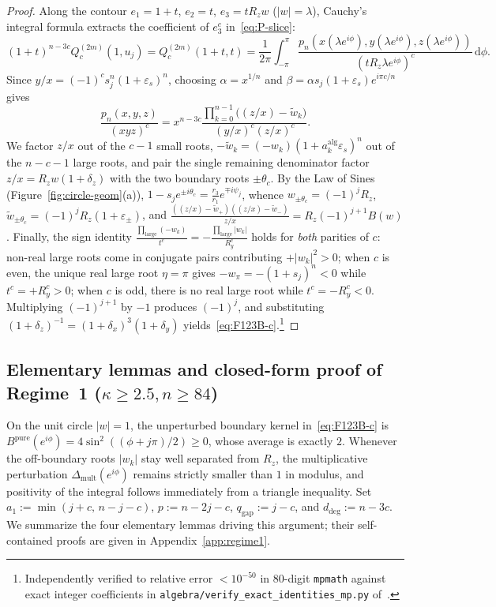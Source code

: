 \documentclass[10pt]{article}
\numberwithin{equation}{section}
\theoremstyle{plain}
\theoremstyle{definition}
\newcommand{\dd}{\mathrm{d}}
\newcommand{\1}{\mathbf{1}}
\newcommand{\code}[1]{\texttt{#1}}
\begin{document}
\begin{proof}
Along the contour $e_1 = 1 + t$, $e_2 = t$, $e_3 = t R_z w$ ($|w| = \lambda$), Cauchy's integral formula extracts the coefficient of $e_3^c$ in~\eqref{eq:P-slice}:
\[
(1 + t)^{n - 3c} Q_c^{(2m)}(1, u_j) = Q_c^{(2m)}(1 + t, t) = \frac{1}{2\pi}\int_{-\pi}^{\pi} \frac{p_n(x(\lambda e^{i\phi}), y(\lambda e^{i\phi}), z(\lambda e^{i\phi}))}{(t R_z \lambda e^{i\phi})^c}\, \dd\phi.
\]
Since $y/x = (-1)^c s_j^n (1 + \varepsilon_s)^n$, choosing $\alpha = x^{1/n}$ and $\beta = \alpha s_j(1 + \varepsilon_s) e^{i\pi c/n}$ gives
\[
\frac{p_n(x, y, z)}{(xyz)^c} = x^{n - 3c}\frac{\prod_{k=0}^{n-1}\bigl((z/x) - \tilde{w}_k\bigr)}{(y/x)^c (z/x)^c}.
\]
We factor $z/x$ out of the $c - 1$ small roots, $-\tilde{w}_k = (-w_k)(1 + a_k^{\mathrm{alg}}\varepsilon_s)^n$ out of the $n - c - 1$ large roots, and pair the single remaining denominator factor $z/x = R_z w(1 + \delta_z)$ with the two boundary roots $\pm\theta_c$. By the Law of Sines (Figure~\ref{fig:circle-geom}(a)), $1 - s_j e^{\pm i\theta_c} = \frac{r_3}{r_1} e^{\mp i\psi_j}$, whence $w_{\pm\theta_c} = (-1)^j R_z$, $\tilde{w}_{\pm\theta_c} = (-1)^j R_z (1 + \varepsilon_\pm)$, and $\frac{((z/x) - \tilde{w}_+)((z/x) - \tilde{w}_-)}{z/x} = R_z (-1)^{j+1} B(w)$. Finally, the sign identity $\frac{\prod_{\mathrm{large}}(-w_k)}{t^c} = -\frac{\prod_{\mathrm{large}}|w_k|}{R_y^c}$ holds for \emph{both} parities of $c$: non-real large roots come in conjugate pairs contributing $+|w_k|^2 > 0$; when $c$ is even, the unique real large root $\eta = \pi$ gives $-w_\pi = -(1+s_j)^n < 0$ while $t^c = +R_y^c > 0$; when $c$ is odd, there is no real large root while $t^c = -R_y^c < 0$. Multiplying $(-1)^{j+1}$ by $-1$ produces $(-1)^j$, and substituting $(1 + \delta_z)^{-1} = (1 + \delta_x)^3 (1 + \delta_y)$ yields~\eqref{eq:F123B-c}.\footnote{Independently verified to relative error $< 10^{-50}$ in $80$-digit \code{mpmath} against exact integer coefficients in \code{algebra/verify\_exact\_identities\_mp.py} of~\cite{JadavRepo2026}.}
\end{proof}

\subsection{Elementary lemmas and closed-form proof of Regime~1 (\texorpdfstring{$\kappa \ge 2.5, n \ge 84$}{kappa >= 2.5, n >= 84})}
\label{sec:r1-proof}

On the unit circle $|w| = 1$, the unperturbed boundary kernel in~\eqref{eq:F123B-c} is $B^{\mathrm{pure}}(e^{i\phi}) = 4\sin^2((\phi + j\pi)/2) \ge 0$, whose average is exactly $2$. Whenever the off-boundary roots $|w_k|$ stay well separated from $R_z$, the multiplicative perturbation $\Delta_{\mathrm{mult}}(e^{i\phi})$ remains strictly smaller than $1$ in modulus, and positivity of the integral follows immediately from a triangle inequality. Set $a_1 := \min(j + c,\, n - j - c)$, $p := n - 2j - c$, $q_{\mathrm{gap}} := j - c$, and $d_{\mathrm{deg}} := n - 3c$. We summarize the four elementary lemmas driving this argument; their self-contained proofs are given in Appendix~\ref{app:regime1}.
\end{document}
